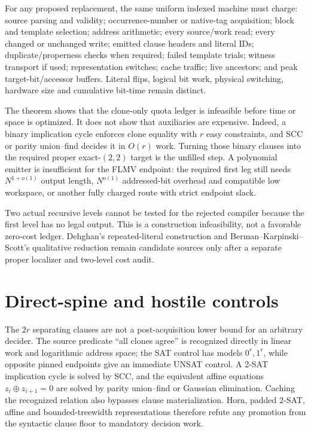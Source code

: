 \documentclass[11pt]{article}
\begin{document}
For any proposed replacement, the same uniform indexed machine must charge:
source parsing and validity; occurrence-number or native-tag acquisition;
block and template selection; address arithmetic; every source/work read;
every changed or unchanged write; emitted clause headers and literal IDs;
duplicate/properness checks when required; failed template trials; witness
transport if used; representation switches; cache traffic; live ancestors;
and peak target-bit/accessor buffers.  Literal flips, logical bit work,
physical switching, hardware size and cumulative bit-time remain distinct.

The theorem shows that the clone-only quota ledger is infeasible before time
or space is optimized.  It does not show that auxiliaries are expensive.
Indeed, a binary implication cycle enforces clone equality with $r$ easy
constraints, and SCC or parity union--find decides it in $O(r)$ work.  Turning
those binary clauses into the required proper exact-$(2,2)$ target is the
unfilled step.  A polynomial emitter is insufficient for the FLMV endpoint:
the required first leg still needs $N^{1+o(1)}$ output length,
$N^{o(1)}$ addressed-bit overhead and compatible low workspace, or another
fully charged route with strict endpoint slack.

Two actual recursive levels cannot be tested for the rejected compiler
because the first level has no legal output.  This is a construction
infeasibility, not a favorable zero-cost ledger.  Dehghan's repeated-literal
construction and Berman--Karpinski--Scott's qualitative reduction remain
candidate sources only after a separate proper localizer and two-level cost
audit.

\section{Direct-spine and hostile controls}

The $2r$ separating clauses are not a post-acquisition lower bound for an
arbitrary decider.  The source predicate ``all clones agree'' is recognized
directly in linear work and logarithmic address space; the SAT control has
models $0^r,1^r$, while opposite pinned endpoints give an immediate UNSAT
control.  A 2-SAT implication cycle is solved by SCC, and the equivalent
affine equations $z_i\oplus z_{i+1}=0$ are solved by parity union--find or
Gaussian elimination.  Caching the recognized relation also bypasses clause
materialization.  Horn, padded 2-SAT, affine and bounded-treewidth
representations therefore refute any promotion from the syntactic clause
floor to mandatory decision work.
\end{document}
